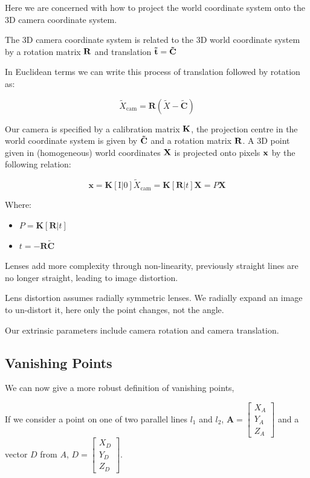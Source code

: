 \documentclass{article}
\begin{document}
Here we are concerned with how to project the world coordinate system onto the 3D camera coordinate system.

The 3D camera coordinate system is related to the 3D world coordinate system by a rotation matrix $\bf R$ and translation $\bf \tilde{t} = \tilde{C}$

In Euclidean terms we can write this process of translation followed by rotation as:

\[
  \tilde{X}_{\text{cam}}= \mathbf{R}(\tilde{X}-\mathbf{\tilde{C}} )
\]

Our camera is specified by a calibration matrix $\bf K$, the projection centre in the world coordinate system is given by $\bf \tilde{C}$ and a rotation matrix $\bf R$. A 3D point given in (homogeneous) world coordinates $\bf X$ is projected onto pixels $\bf x$ by the following relation:

\[
  \mathbf{x} = \mathbf{K}[\text{I}|0]\tilde{X}_{\text{cam}} = \mathbf{K} [\mathbf{R} | t]\mathbf{X} = P \mathbf{X}
\]

Where:

\begin{itemize}
  \item $P = \mathbf{K}[\mathbf{R}|t ]$
  \item $t = -\mathbf{R \tilde{C}}$
\end{itemize}

Lenses add more complexity through non-linearity, previously straight lines are no longer straight, leading to image distortion.

Lens distortion assumes radially symmetric lenses. We radially expand an image to un-distort it, here only the point changes, not the angle.

Our extrinsic parameters include camera rotation and camera translation.

\subsection{Vanishing Points}

We can now give a more robust definition of vanishing points,

If we consider a point on one of two parallel lines $l_{1}$ and $l_{2}$, $\mathbf{A} = \begin{bmatrix}
X_{A}\\Y_{A}\\Z_{A}
\end{bmatrix} $ and a vector $D$ from $A$, $D = \begin{bmatrix}
X_{D}\\ Y_{D}\\Z_{D}
\end{bmatrix}$.
\end{document}
